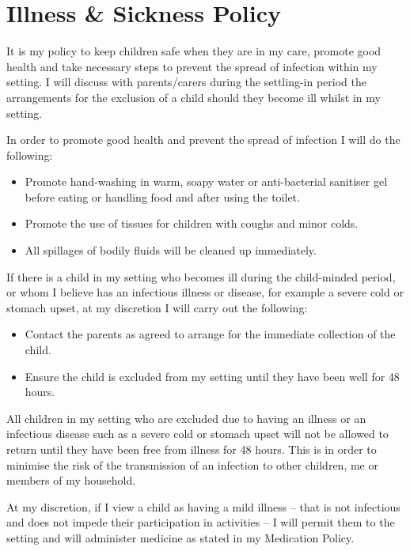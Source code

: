 \documentclass[10pt]{article}
\begin{document}
\section{Illness \& Sickness Policy}

It is my policy to keep children safe when they are in my care, promote
good health and take necessary steps to prevent the spread of infection
within my setting. I will discuss with parents/carers during the
settling-in period the arrangements for the exclusion of a child should
they become ill whilst in my setting.

In order to promote good health and prevent the spread of infection I
will do the following:

\begin{itemize}
\item
  Promote hand-washing in warm, soapy water or anti-bacterial sanitiser
  gel before eating or handling food and after using the toilet.~
\item
  Promote the use of tissues for children with coughs and minor colds.~
\item
  All spillages of bodily fluids will be cleaned up immediately.~
\end{itemize}

If there is a child in my setting who becomes ill during the
child-minded period, or whom I believe has an infectious illness or
disease, for example a severe cold or stomach upset, at my discretion I
will carry out the following:

\begin{itemize}
\item
  Contact the parents as agreed to arrange for the immediate
  collection of the child. ~
\item
  Ensure the child is excluded from my setting until they have been
  well for 48 hours.~
\end{itemize}

All children in my setting who are excluded due to having an illness or
an infectious disease such as a severe cold or stomach upset will not be
allowed to return until they have been free from illness for 48 hours.
This is in order to minimise the risk of the transmission of an
infection to other children, me or members of my household.

At my discretion, if I view a child as having a mild illness -- that is
not infectious and does not impede their participation in activities --
I will permit them to the setting and will administer medicine as stated
in my Medication Policy.
\end{document}
